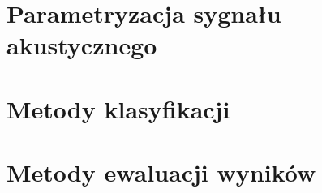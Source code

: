\section{Parametryzacja sygnału akustycznego}
\label{sec:parametryzacja-sygnalu-akustycznego}


\section{Metody klasyfikacji}
\label{sec:klasyfikacja}


\section{Metody ewaluacji wyników}
\label{sec:metody-ewaluacji-wyników}